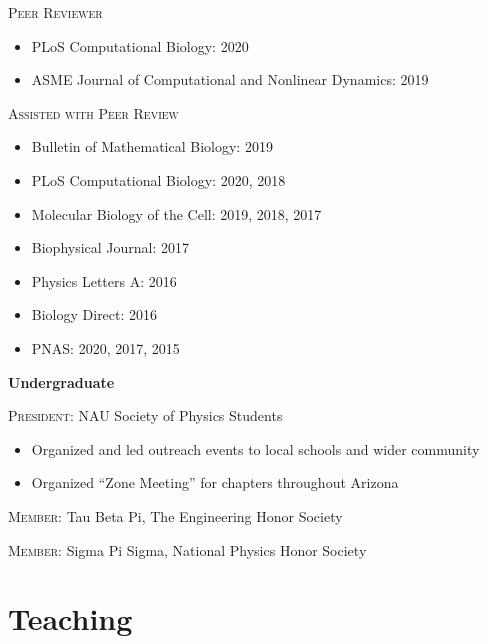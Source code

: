 \documentclass[letterpaper,10pt]{article} %
\begin{document}
\textsc{Peer Reviewer}
\begin{itemize}
\item PLoS Computational Biology: 2020
\item ASME Journal of Computational and Nonlinear Dynamics: 2019
\end{itemize}

\textsc{Assisted with Peer Review}
\begin{itemize}
\item Bulletin of Mathematical Biology: 2019
\item PLoS Computational Biology: 2020, 2018
\item Molecular Biology of the Cell: 2019, 2018, 2017
\item Biophysical Journal: 2017
\item Physics Letters A: 2016
\item Biology Direct: 2016
\item PNAS: 2020, 2017, 2015
\end{itemize}

\bigskip

{\large \textbf{Undergraduate}}

\textsc{President:} NAU Society of Physics Students
\begin{itemize}
\item Organized and led outreach events to local schools and wider community
\item Organized ``Zone Meeting'' for chapters throughout Arizona
\end{itemize}

\textsc{Member:} Tau Beta Pi, The Engineering Honor Society

\textsc{Member:} Sigma Pi Sigma, National Physics Honor Society

\bigskip
\section*{Teaching}
\bigskip
\end{document}
